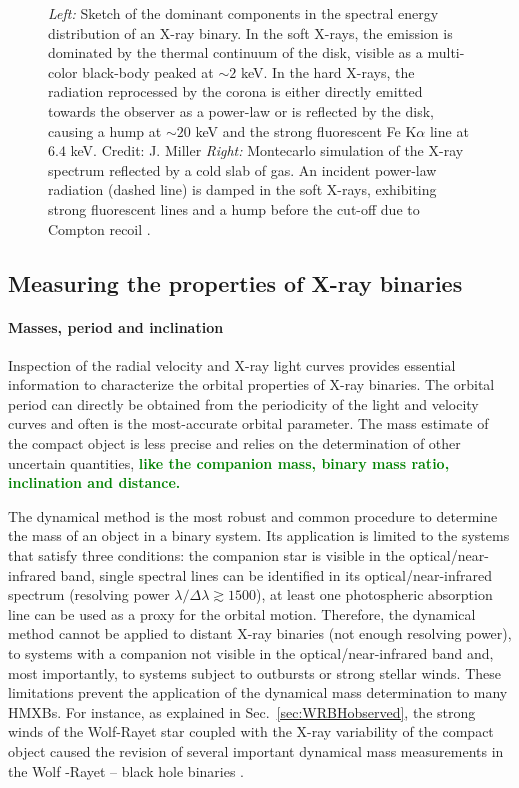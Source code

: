 \documentclass[a4paper,titlepage]{book}     	%
\newcommand{\erika}[1]{\textcolor{green}{\bf#1}}
\begin{document}
\begin{figure}
\begin{minipage}{.42\textwidth}
	\end{minipage}
	\caption{\emph{Left:} Sketch of the dominant components in the spectral energy distribution of an X-ray binary. In the soft X-rays, the emission is dominated by the thermal continuum of the disk, visible as a multi-color black-body peaked at $\sim 2$ keV. In the hard X-rays, the radiation reprocessed by the corona is either directly emitted towards the observer as a power-law or is reflected by the disk, causing a hump at $\sim 20$ keV and the strong fluorescent Fe K$\alpha$ line at $6.4$ keV. Credit: J. Miller \emph{Right:} Montecarlo simulation of the X-ray spectrum reflected by a cold slab of gas. An incident power-law radiation (dashed line) is damped in the soft X-rays, exhibiting strong fluorescent lines and a hump before the cut-off due to Compton recoil \cite{FeKalphaline_Fabian2000}.}\label{fig:accretiondisk}
\end{figure}

\subsection{Measuring the properties of  X-ray binaries}\label{subsec:Xraymeasure}
\paragraph{Masses, period and inclination}
Inspection of the radial velocity and X-ray light curves provides essential information to characterize the orbital properties of X-ray binaries. The orbital period can directly be obtained from the periodicity of the light and velocity curves and often is the most-accurate orbital parameter. The mass estimate of the compact object is less precise and relies on the determination of other uncertain quantities, \erika{like the companion mass, binary mass ratio, inclination and distance.}

The dynamical method is the most robust and common procedure to determine the mass of an object in a binary system. Its application is limited to the systems that satisfy three conditions: the companion star is visible in the optical/near-infrared band, single spectral lines can be identified in its optical/near-infrared spectrum (resolving power $\lambda/\Delta \lambda \gtrsim 1500$), at least one photospheric absorption line can be used as a proxy for the orbital motion. Therefore, the dynamical method cannot be applied to distant X-ray binaries (not enough resolving power), to systems with a companion not visible in the optical/near-infrared band and, most importantly, to systems subject to outbursts or strong stellar winds. These limitations prevent the application of the dynamical mass determination to many HMXBs. For instance, as explained in Sec.\ \ref{sec:WRBHobserved}, the strong winds of the  Wolf-Rayet star coupled with the X-ray variability of the compact object caused the revision of several important dynamical mass measurements in the Wolf -Rayet -- black hole binaries \cite{ICX10X-1_Laycock2015_revisited}.
\end{document}
